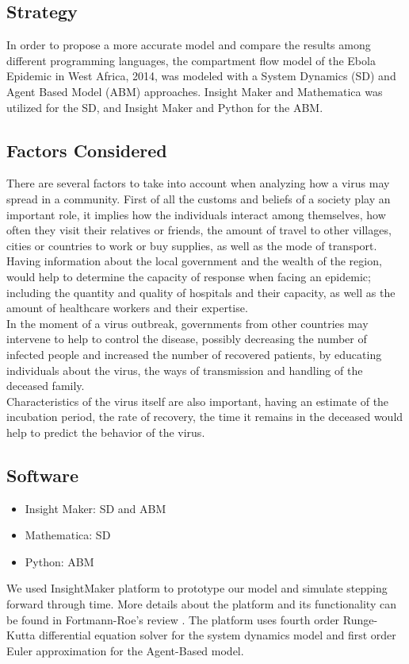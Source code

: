 \documentclass[10pt]{article}
\begin{document}
\subsection{Strategy}
In order to propose a more accurate model and compare the results among different programming  languages, the compartment flow model of the Ebola Epidemic in West Africa, 2014, was modeled with a System Dynamics (SD) and Agent Based Model (ABM) approaches.  Insight Maker and Mathematica was utilized  for the SD, and Insight Maker and Python for the ABM.

\subsection{Factors Considered}
There are several factors to take into account when analyzing how a virus may spread in a community. First of all the customs and beliefs of a society play an important role, it implies how the individuals interact among themselves, how often they visit their relatives or friends, the amount of travel to other villages, cities or countries to work or buy supplies, as well as the mode of transport.\\
Having information about the local government and the wealth of the region, would help to determine the capacity of response when facing an epidemic; including the quantity and quality of hospitals and their capacity, as well as the amount of healthcare workers and their expertise.\\
In the moment of a virus outbreak, governments from other countries may intervene to help to control the disease, possibly decreasing the number of infected people and increased the number of recovered patients, by educating individuals about the virus, the ways of transmission and handling of the deceased family. \\
Characteristics of the virus itself are also important, having an estimate of the incubation period, the rate of recovery, the time it remains in the deceased would help to predict the behavior of the virus.\\

\subsection{Software}
\begin{itemize}
\item Insight Maker: SD and ABM
\item Mathematica: SD
\item Python: ABM

\end{itemize}
We used InsightMaker platform to prototype our model and simulate stepping forward through time. More details about the platform and its functionality can be found in Fortmann-Roe's review \cite{FortmannRoe}. The platform uses fourth order Runge-Kutta differential equation solver for the system dynamics model and  first order Euler approximation for the Agent-Based model.
\end{document}
